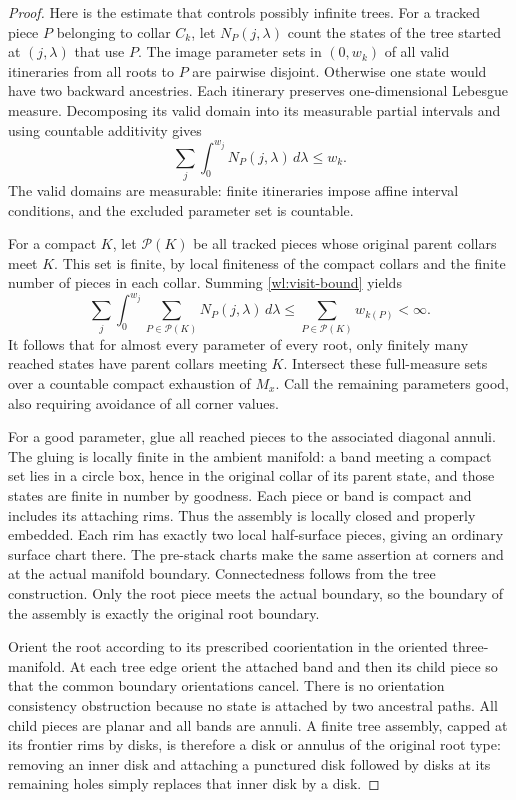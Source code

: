 \begin{proof}
Here is the estimate that controls possibly infinite trees.  For a tracked
piece $P$ belonging to collar $C_k$, let $N_P(j,\lambda)$ count the states
of the tree started at $(j,\lambda)$ that use $P$.  The image parameter sets
in $(0,w_k)$ of all valid itineraries from all roots to $P$ are pairwise
disjoint.  Otherwise one state would have two backward ancestries.  Each
itinerary preserves one-dimensional Lebesgue measure.  Decomposing its
valid domain into its measurable partial intervals and using countable
additivity gives
\begin{equation}
\label{wl:visit-bound}
             \sum_j\int_0^{w_j} N_P(j,\lambda)\,d\lambda\leq w_k.
\end{equation}
The valid domains are measurable: finite itineraries impose affine interval
conditions, and the excluded parameter set is countable.

For a compact $K$, let $\mathcal P(K)$ be all tracked pieces whose original
parent collars meet $K$.  This set is finite, by local finiteness of the
compact collars and the finite number of pieces in each collar.  Summing
\eqref{wl:visit-bound} yields
\[
 \sum_j\int_0^{w_j}
      \sum_{P\in\mathcal P(K)}N_P(j,\lambda)\,d\lambda
       \leq\sum_{P\in\mathcal P(K)}w_{k(P)}<\infty.
\]
It follows that for almost every parameter of every root, only finitely
many reached states have parent collars meeting $K$.  Intersect these
full-measure sets over a countable compact exhaustion of $M_x$.  Call the
remaining parameters good, also requiring avoidance of all corner values.

For a good parameter, glue all reached pieces to the associated diagonal
annuli.  The gluing is locally finite in the ambient manifold: a band meeting
a compact set lies in a circle box, hence in the original collar of its
parent state, and those states are finite in number by goodness.  Each
piece or band is compact and includes its attaching rims.  Thus the assembly
is locally closed and properly embedded.  Each rim has exactly two local
half-surface pieces, giving an ordinary surface chart there.  The pre-stack
charts make the same assertion at corners and at the actual manifold
boundary.  Connectedness follows from the tree construction.  Only the root
piece meets the actual boundary, so the boundary of the assembly is exactly
the original root boundary.

Orient the root according to its prescribed coorientation in the oriented
three-manifold.  At each tree edge orient the attached band and then its
child piece so that the common boundary orientations cancel.  There is no
orientation consistency obstruction because no state is attached by two
ancestral paths.  All child pieces are planar and all bands are annuli.
A finite tree assembly, capped at its frontier rims by disks, is therefore
a disk or annulus of the original root type: removing an inner disk and
attaching a punctured disk followed by disks at its remaining holes simply
replaces that inner disk by a disk.


\end{proof}
